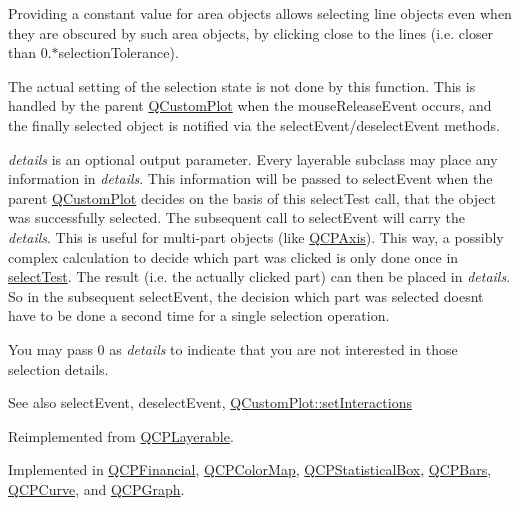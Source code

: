 Providing a constant value for area objects allows selecting line objects even when they are obscured by such area objects, by clicking close to the lines (i.\+e. closer than 0.$\ast$selection\+Tolerance).

The actual setting of the selection state is not done by this function. This is handled by the parent \hyperlink{class_q_custom_plot}{Q\+Custom\+Plot} when the mouse\+Release\+Event occurs, and the finally selected object is notified via the select\+Event/deselect\+Event methods.

{\itshape details} is an optional output parameter. Every layerable subclass may place any information in {\itshape details}. This information will be passed to select\+Event when the parent \hyperlink{class_q_custom_plot}{Q\+Custom\+Plot} decides on the basis of this select\+Test call, that the object was successfully selected. The subsequent call to select\+Event will carry the {\itshape details}. This is useful for multi-\/part objects (like \hyperlink{class_q_c_p_axis}{Q\+C\+P\+Axis}). This way, a possibly complex calculation to decide which part was clicked is only done once in \hyperlink{class_q_c_p_abstract_plottable_a38efe9641d972992a3d44204bc80ec1d}{select\+Test}. The result (i.\+e. the actually clicked part) can then be placed in {\itshape details}. So in the subsequent select\+Event, the decision which part was selected doesn\textquotesingle{}t have to be done a second time for a single selection operation.

You may pass 0 as {\itshape details} to indicate that you are not interested in those selection details.

\begin{DoxySeeAlso}{See also}
select\+Event, deselect\+Event, \hyperlink{class_q_custom_plot_a5ee1e2f6ae27419deca53e75907c27e5}{Q\+Custom\+Plot\+::set\+Interactions} 
\end{DoxySeeAlso}


Reimplemented from \hyperlink{class_q_c_p_layerable_a04db8351fefd44cfdb77958e75c6288e}{Q\+C\+P\+Layerable}.



Implemented in \hyperlink{class_q_c_p_financial_a77bffad8f3fcbcccbef03ead1c538e3a}{Q\+C\+P\+Financial}, \hyperlink{class_q_c_p_color_map_aba91ea58b489031157ecb777fe79e309}{Q\+C\+P\+Color\+Map}, \hyperlink{class_q_c_p_statistical_box_a0153ac16326b94450afbca208e3f9961}{Q\+C\+P\+Statistical\+Box}, \hyperlink{class_q_c_p_bars_a62d66cc8eedca6bedfc1f6513164d418}{Q\+C\+P\+Bars}, \hyperlink{class_q_c_p_curve_a87a9fb34a2a48dcae4c1245ada235e7d}{Q\+C\+P\+Curve}, and \hyperlink{class_q_c_p_graph_a36011c34aca4f7a477de25961e2f6c13}{Q\+C\+P\+Graph}.

